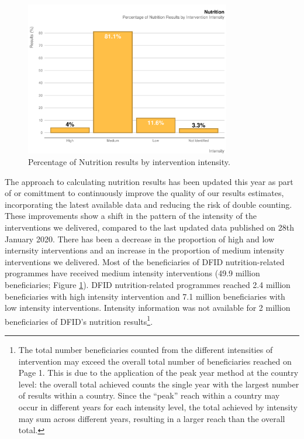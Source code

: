 \begin{figure}[htbp]
	\centering
\begin{knitrout}
\color{fgcolor}
\includegraphics[width=0.8\textwidth]{figs/nutrition_intensity_plot-1} 

\end{knitrout}
	\caption{Percentage of Nutrition results by intervention intensity.}\label{fig:nutrition_intensity_plot}
\end{figure}

The approach to calculating nutrition results has been updated this year as part of or comittment to continuously improve the quality of our results estimates, incorporating the latest available data and reducing the risk of double counting. %
These improvements show a shift in the pattern of the intensity of the interventions we delivered, compared to the last updated data published on 28th January 2020. %
There has been a decrease in the proportion of high and low internsity interventions and an increase in the proportion of medium intensity interventions we delivered. %
Most of the beneficiaries of DFID nutrition-related programmes have received medium intensity interventions (49.9 million
beneficiaries; Figure \ref{fig:nutrition_intensity_plot}). %
DFID nutrition-related programmes reached 2.4 million beneficiaries with high intensity intervention and 7.1 million beneficiaries with low intensity interventions. %
Intensity information was not available for 2 million beneficiaries of DFID's nutrition results\footnote{The total number beneficiaries counted from the different intensities of intervention may exceed the overall total number of beneficiaries reached on Page 1. This is due to the application of the peak year method at the country level: the overall total achieved counts the single year with the largest number of results within a country. Since the ``peak'' reach within a country may occur in different years for each intensity level, the total achieved by intensity may sum across different years, resulting in a larger reach than the overall total.}. %

